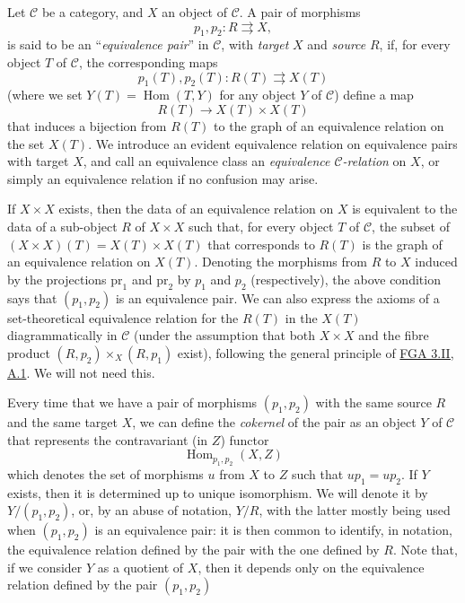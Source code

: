 \documentclass{article}
\newcommand{\oldpage}[1]{\marginpar{\footnotesize$\Big\vert$ \textit{p.~#1}}}
\theoremstyle{definition}
\theoremstyle{definition}
\theoremstyle{definition}
\theoremstyle{definition}
\theoremstyle{remark}
\begin{document}
Let \({\mathcal{C}}\) be a category, and \(X\) an object of \({\mathcal{C}}\).
\oldpage{212-02}A pair of morphisms
\[
  p_1,p_2\colon R\rightrightarrows X,
\]
is said to be an ``\emph{equivalence pair}'' in \({\mathcal{C}}\), with \emph{target} \(X\) and \emph{source} \(R\), if, for every object \(T\) of \({\mathcal{C}}\), the corresponding maps
\[
  p_1(T),p_2(T)\colon R(T)\rightrightarrows X(T)
\]
(where we set \(Y(T)=\operatorname{Hom}(T,Y)\) for any object \(Y\) of \({\mathcal{C}}\)) define a map
\[
  R(T)\to X(T)\times X(T)
\]
that induces a bijection from \(R(T)\) to the graph of an equivalence relation on the set \(X(T)\).
We introduce an evident equivalence relation on equivalence pairs with target \(X\), and call an equivalence class an \emph{equivalence \({\mathcal{C}}\)-relation} on \(X\), or simply an equivalence relation if no confusion may arise.

If \(X\times X\) exists, then the data of an equivalence relation on \(X\) is equivalent to the data of a sub-object \(R\) of \(X\times X\) such that, for every object \(T\) of \({\mathcal{C}}\), the subset of \((X\times X)(T)=X(T)\times X(T)\) that corresponds to \(R(T)\) is the graph of an equivalence relation on \(X(T)\).
Denoting the morphisms from \(R\) to \(X\) induced by the projections \(\mathrm{pr}_1\) and \(\mathrm{pr}_2\) by \(p_1\) and \(p_2\) (respectively), the above condition says that \((p_1,p_2)\) is an equivalence pair.
We can also express the axioms of a set-theoretical equivalence relation for the \(R(T)\) in the \(X(T)\) diagrammatically in \({\mathcal{C}}\) (under the assumption that both \(X\times X\) and the fibre product \((R,p_2)\times_X(R,p_1)\) exist), following the general principle of \protect\hyperlink{fga-3-ii-section-A.1}{FGA 3.II, A.1}.
We will not need this.

Every time that we have a pair of morphisms \((p_1,p_2)\) with the same source \(R\) and the same target \(X\), we can define the \emph{cokernel} of the pair as an object \(Y\) of \({\mathcal{C}}\) that represents the contravariant (in \(Z\)) functor
\[
  \operatorname{Hom}_{p_1,p_2}(X,Z)
\]
which denotes the set of morphisms \(u\) from \(X\) to \(Z\) such that \(up_1=up_2\).
If \(Y\) exists, then it is determined up to unique isomorphism.
\oldpage{212-03}We will denote it by \(Y/(p_1,p_2)\), or, by an abuse of notation, \(Y/R\), with the latter mostly being used when \((p_1,p_2)\) is an equivalence pair: it is then common to identify, in notation, the equivalence relation defined by the pair with the one defined by \(R\).
Note that, if we consider \(Y\) as a quotient of \(X\), then it depends only on the equivalence relation defined by the pair \((p_1,p_2)\)
\end{document}
